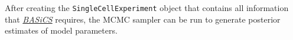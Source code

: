 \documentclass[9pt,a4paper,]{extarticle}
\newenvironment{Shaded}{\begin{snugshade}}{\end{snugshade}}
\newcommand{\KeywordTok}[1]{\textcolor[rgb]{0.13,0.29,0.53}{\textbf{#1}}}
\newcommand{\NormalTok}[1]{#1}
\newcommand{\OperatorTok}[1]{\textcolor[rgb]{0.81,0.36,0.00}{\textbf{#1}}}
\newcommand{\StringTok}[1]{\textcolor[rgb]{0.31,0.60,0.02}{#1}}
\begin{document}
\begin{Shaded}
\end{Shaded}

After creating the \texttt{SingleCellExperiment} object that contains all information
that \emph{\href{https://bioconductor.org/packages/3.11/BASiCS}{BASiCS}} requires, the MCMC sampler can be run to generate
posterior estimates of model parameters.

{\small}
\end{document}
